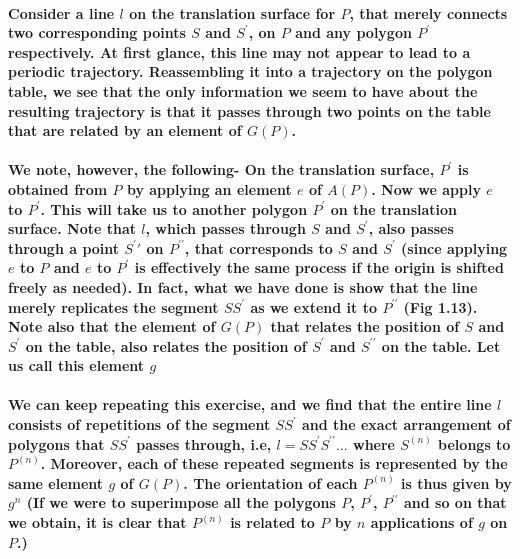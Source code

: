 \documentclass{report}
\begin{document}
\paragraph{Consider a line $l$ on the translation surface for $P$, that merely connects two corresponding points $S$ and $S^\prime$, on $P$ and any polygon $P^\prime$ respectively. At first glance, this line may not appear to lead to a periodic trajectory. Reassembling it into a trajectory on the polygon table, we see that the only information we seem to have about the resulting trajectory is that it passes through two points on the table that are related by an element of $G(P)$.}

\paragraph{We note, however, the following- On the translation surface, $P^\prime$ is obtained from $P$ by applying an element $e$ of $A(P)$. Now we apply $e$ to $P^\prime$. This will take us to another polygon $P^\prime$ on the translation surface. Note that $l$, which passes through $S$ and $S^\prime$, also passes through a point $S^\prime\prime$ on $P^{\prime\prime}$, that corresponds to $S$ and $S^\prime$ (since applying $e$ to $P$ and $e$ to $P^\prime$ is effectively the same process if the origin is shifted freely as needed). In fact, what we have done is show that the line merely replicates the segment $SS^\prime$ as we extend it to $P^{\prime\prime}$ (Fig 1.13). Note also that the element of $G(P)$ that relates the position of $S$ and $S^\prime$ on the table, also relates the position of $S^\prime$ and $S^{\prime\prime}$ on the table. Let us call this element $g$}






\paragraph{We can keep repeating this exercise, and we find that the entire line $l$ consists of repetitions of the segment $SS^\prime$ and the exact arrangement of polygons that $SS^\prime$ passes through, i.e, $l = SS^{\prime}S^{\prime\prime}...$ where $S^{(n)}$ belongs to $P^{(n)}$. Moreover, each of these repeated segments is represented by the same element $g$ of $G(P)$. The orientation of each $P^{(n)}$ is thus given by $g^n$ (If we were to superimpose all the polygons $P$, $P^\prime$, $P^{\prime\prime}$ and so on that we obtain, it is clear that $P^{(n)}$ is related to $P$ by $n$ applications of $g$ on $P$.)}
\end{document}
